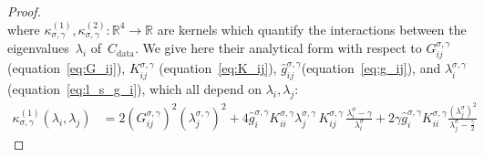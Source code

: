 \documentclass[11pt]{article}
\newcommand{\RR}{\mathbb{R}}
\begin{document}
\begin{proof}
\begin{equation*}
\end{equation*}
where $\kappa^{(1)}_{\sigma, \gamma}, \kappa^{(2)}_{\sigma, \gamma} : \RR^4\to  \RR$ are kernels which quantify the interactions between the eigenvalues~$\lambda_i$ of~$C_\mathrm{data}$. We give here their analytical form with respect to $G^{\sigma, \gamma}_{ij}$ (equation~\ref{eq:G_ij}), $K^{\sigma, \gamma}_{ij}$ (equation~\ref{eq:K_ij}), $\hat g^{\sigma, \gamma}_{ij}$(equation~\ref{eq:g_ij}), and $\lambda^{\sigma, \gamma}_i$ (equation~\ref{eq:l_s_g_i}), which all depend on $\lambda_i, \lambda_j$:
\begin{align} \label{eq:kappa1}
    \kappa^{(1)}_{\sigma, \gamma}(\lambda_i, \lambda_j) &=  2 ( G^{\sigma, \gamma}_{ij})^2  (\lambda^{\sigma, \gamma}_j)^2 
    + 4 \hat g^{\sigma, \gamma}_i K^{\sigma, \gamma}_{ii} \lambda^{\sigma, \gamma}_{j} \, K^{\sigma, \gamma}_{ij} \,\frac{\lambda^\sigma_i - \gamma}{\lambda^\sigma_i } 
    + 2 \gamma \hat g^{\sigma, \gamma}_i K^{\sigma, \gamma}_{ii}
 \frac{(\lambda^\sigma_j)^2}{\lambda^\sigma_j - \frac{\gamma}{2}}%

\end{align}
\end{proof}
\end{document}
